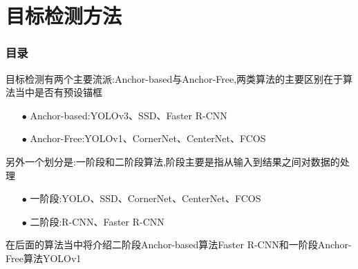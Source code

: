 \section{目标检测方法}

\begin{frame}[allowframebreaks]
    \frametitle{\textsc{目录}} \vspace{-0.3cm}
    \begin{spacing}{0.0}
    \end{spacing}   %
\end{frame}

\begin{frame}
    目标检测有两个主要流派:Anchor-based与Anchor-Free,两类算法的主要区别在于算法当中是否有预设锚框\\
    \begin{itemize}
        \item[$ \bullet $] Anchor-based:YOLOv3、SSD、Faster \;R-CNN
        \item[$ \bullet $] Anchor-Free:YOLOv1、CornerNet、CenterNet、FCOS
    \end{itemize}

    \vspace{1em}
    另外一个划分是:一阶段和二阶段算法,阶段主要是指从输入到结果之间对数据的处理\\
    \begin{itemize}
        \item[$ \bullet $] 一阶段:YOLO、SSD、CornerNet、CenterNet、FCOS
        \item[$ \bullet $] 二阶段:R-CNN、Faster \;R-CNN
    \end{itemize}

    \vspace{1em}
    在后面的算法当中将介绍二阶段Anchor-based算法Faster\; R-CNN和一阶段Anchor-Free算法YOLOv1\\

\end{frame}


